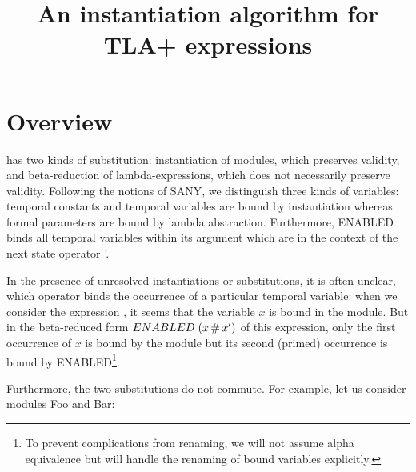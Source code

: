 \documentclass[a4paper]{article}
\title{An instantiation algorithm for TLA+ expressions}
\author{}
\theoremstyle{definition}
\begin{document}
\maketitle

\section{Overview}
\label{sec:overview}
\tlaplus{} has two kinds of substitution: instantiation of modules, which
preserves validity, and beta-reduction of lambda-expressions, which does not
necessarily preserve validity. Following the notions of SANY, we distinguish
three kinds of variables: temporal constants and temporal variables are
bound by instantiation whereas formal parameters are bound by lambda
abstraction. Furthermore, ENABLED binds all temporal variables within its
argument which are in the context of the next state operator '.

In the presence of unresolved instantiations or substitutions, it is often
unclear, which operator binds the occurrence of a particular temporal variable:
when we consider the expression
, it seems that the variable
$x$ is bound in the module. But in the beta-reduced form $ENABLED\; (x \,\#\, x')$
of this expression, only the first occurrence of $x$ is bound by the
module but its second (primed) occurrence is bound by ENABLED\footnote{To
  prevent complications from renaming, we will not assume alpha equivalence but
  will handle the renaming of bound variables explicitly.}.

Furthermore, the two substitutions do not commute. For example, let us
consider modules Foo and Bar:

\begin{parcolumns}{2}
\end{parcolumns}
\end{document}

